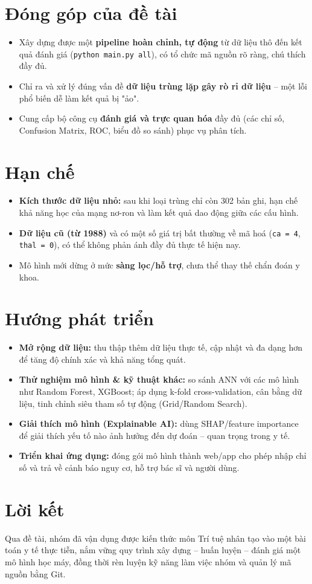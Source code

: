 \section{Đóng góp của đề tài}
\begin{itemize}
  \item Xây dựng được một \textbf{pipeline hoàn chỉnh, tự động} từ dữ liệu thô
        đến kết quả đánh giá (\texttt{python main.py all}), có tổ chức mã nguồn
        rõ ràng, chú thích đầy đủ.
  \item Chỉ ra và xử lý đúng vấn đề \textbf{dữ liệu trùng lặp gây rò rỉ dữ liệu}
        -- một lỗi phổ biến dễ làm kết quả bị "ảo".
  \item Cung cấp bộ công cụ \textbf{đánh giá và trực quan hóa} đầy đủ (các chỉ
        số, Confusion Matrix, ROC, biểu đồ so sánh) phục vụ phân tích.
\end{itemize}

\section{Hạn chế}
\begin{itemize}
  \item \textbf{Kích thước dữ liệu nhỏ:} sau khi loại trùng chỉ còn 302 bản
        ghi, hạn chế khả năng học của mạng nơ-ron và làm kết quả dao động giữa
        các cấu hình.
  \item \textbf{Dữ liệu cũ (từ 1988)} và có một số giá trị bất thường về mã hoá
        (\texttt{ca = 4}, \texttt{thal = 0}), có thể không phản ánh đầy đủ thực
        tế hiện nay.
  \item Mô hình mới dừng ở mức \textbf{sàng lọc/hỗ trợ}, chưa thể thay thế chẩn
        đoán y khoa.
\end{itemize}

\section{Hướng phát triển}
\begin{itemize}
  \item \textbf{Mở rộng dữ liệu:} thu thập thêm dữ liệu thực tế, cập nhật và đa
        dạng hơn để tăng độ chính xác và khả năng tổng quát.
  \item \textbf{Thử nghiệm mô hình \& kỹ thuật khác:} so sánh ANN với các mô
        hình như Random Forest, XGBoost; áp dụng k-fold cross-validation, cân
        bằng dữ liệu, tinh chỉnh siêu tham số tự động (Grid/Random Search).
  \item \textbf{Giải thích mô hình (Explainable AI):} dùng SHAP/feature
        importance để giải thích yếu tố nào ảnh hưởng đến dự đoán -- quan trọng
        trong y tế.
  \item \textbf{Triển khai ứng dụng:} đóng gói mô hình thành web/app cho phép
        nhập chỉ số và trả về cảnh báo nguy cơ, hỗ trợ bác sĩ và người dùng.
\end{itemize}

\section{Lời kết}
Qua đề tài, nhóm đã vận dụng được kiến thức môn Trí tuệ nhân tạo vào một bài
toán y tế thực tiễn, nắm vững quy trình xây dựng -- huấn luyện -- đánh giá một
mô hình học máy, đồng thời rèn luyện kỹ năng làm việc nhóm và quản lý mã nguồn
bằng Git.
